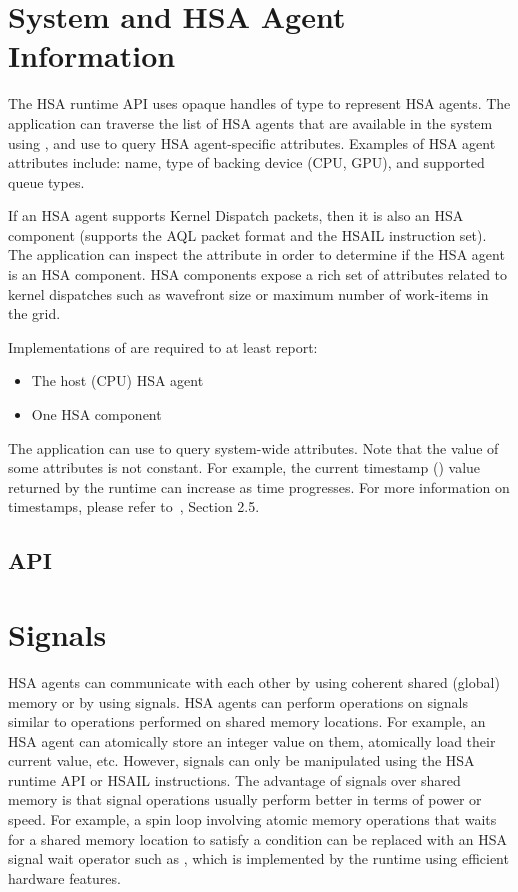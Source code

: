 \documentclass[final,oneside]{book}
\begin{document}
\section{System and HSA Agent Information}
\label{sec:agentinfo}

The HSA runtime API uses opaque handles of type  to
represent HSA agents. The application can traverse the list of HSA agents that
are available in the system using , and use
 to query HSA agent-specific attributes. Examples of
HSA agent attributes include: name, type of backing device (CPU, GPU), and
supported queue types.

If an HSA agent supports Kernel Dispatch packets, then it is also an HSA
component (supports the AQL packet format and the HSAIL instruction set). The
application can inspect the  attribute in order
to determine if the HSA agent is an HSA component. HSA components expose a rich
set of attributes related to kernel dispatches such as wavefront size or maximum
number of work-items in the grid.

Implementations of  are required to at least report:
\begin{itemize}[itemsep=1pt,topsep=3pt,partopsep=0pt]
\item The host (CPU) HSA agent
\item One HSA component
\end{itemize}

The application can use  to query system-wide
attributes. Note that the value of some attributes is not constant. For example,
the current timestamp () value returned by the
runtime can increase as time progresses. For more information on timestamps,
please refer to~\cite{sar}, Section 2.5.

\subsection{API}


\section{Signals}\label{sec:signals}

HSA agents can communicate with each other by using coherent shared (global)
memory or by using signals. HSA agents can perform operations on signals similar
to operations performed on shared memory locations. For example, an HSA agent
can atomically store an integer value on them, atomically load their current
value, etc. However, signals can only be manipulated using the HSA runtime API
or HSAIL instructions. The advantage of signals over shared memory is that
signal operations usually perform better in terms of power or speed. For
example, a spin loop involving atomic memory operations that waits for a shared
memory location to satisfy a condition can be replaced with an HSA signal wait
operator such as , which is implemented by the
runtime using efficient hardware features.
\end{document}
